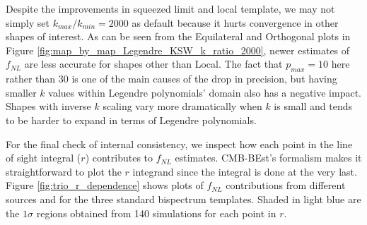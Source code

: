 Despite the improvements in squeezed limit and local template, we may not simply set $k_{max} / k_{min} = 2000$ as default because it hurts convergence in other shapes of interest. As can be seen from the Equilateral and Orthogonal plots in Figure \ref{fig:map_by_map_Legendre_KSW_k_ratio_2000}, newer estimates of $f_{NL}$ are less accurate for shapes other than Local. The fact that $p_{max}=10$ here rather than $30$ is one of the main causes of the drop in precision, but having smaller $k$ values within Legendre polynomials' domain also has a negative impact. Shapes with inverse $k$ scaling vary more dramatically when $k$ is small and tends to be harder to expand in terms of Legendre polynomials.

For the final check of internal consistency, we inspect how each point in the line of sight integral ($r$) contributes to $f_{NL}$ estimates. CMB-BEst's formalism makes it straightforward to plot the $r$ integrand since the integral is done at the very last. Figure \ref{fig:trio_r_dependence} shows plots of $f_{NL}$ contributions from different sources and for the three standard bispectrum templates. Shaded in light blue are the $1\sigma$ regions obtained from 140 simulations for each point in $r$.

